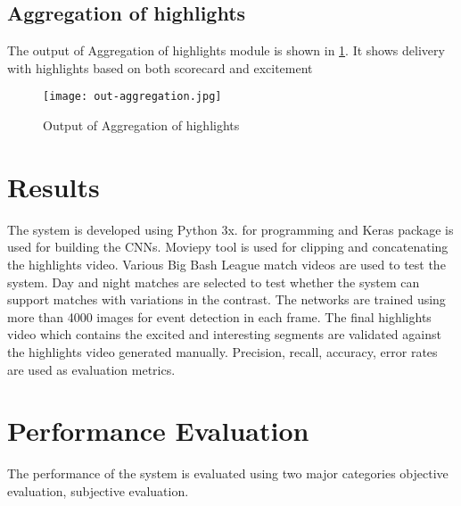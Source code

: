 \subsection{Aggregation of highlights}
The output of Aggregation of highlights module is shown in \ref{fig:out-Aggregation of highlights}. It shows delivery with highlights based on both scorecard and excitement
\begin{figure}[h]
    \centering
   \texttt{[image: out-aggregation.jpg]}
    \caption{Output of Aggregation of highlights}
    \label{fig:out-Aggregation of highlights}
\end{figure}


\section{Results}
The system is developed using Python 3x. for programming and Keras package is used for building the CNNs. Moviepy tool is used for clipping and concatenating the highlights video. Various Big Bash League match videos are used to test the system. Day and night matches are selected to test whether the system can support matches with variations in the contrast. The networks are trained using more than 4000 images for event detection in each frame. The final highlights video which contains the excited and interesting segments are validated against the highlights video generated manually. Precision, recall, accuracy, error rates are used as evaluation metrics.
\section{Performance Evaluation}
The performance of the system is evaluated using two major categories objective evaluation, subjective evaluation.

